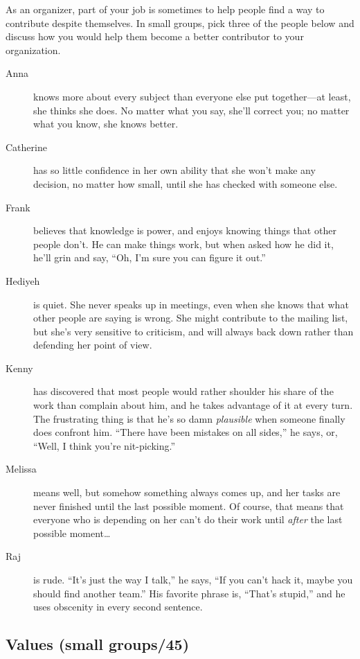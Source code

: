 As an organizer, part of your job is sometimes to help people find a way
to contribute despite themselves. In small groups, pick three of the
people below and discuss how you would help them become a better
contributor to your organization.

\begin{description}
\item[Anna]
knows more about every subject than everyone else put together---at
least, she thinks she does. No matter what you say, she'll correct
you; no matter what you know, she knows better.
\item[Catherine]
has so little confidence in her own ability that she won't make any
decision, no matter how small, until she has checked with someone
else.
\item[Frank]
believes that knowledge is power, and enjoys knowing things that
other people don't. He can make things work, but when asked how he
did it, he'll grin and say, ``Oh, I'm sure you can figure it out.''
\item[Hediyeh]
is quiet. She never speaks up in meetings, even when she knows that
what other people are saying is wrong. She might contribute to the
mailing list, but she's very sensitive to criticism, and will always
back down rather than defending her point of view.
\item[Kenny]
has discovered that most people would rather shoulder his share of
the work than complain about him, and he takes advantage of it at
every turn. The frustrating thing is that he's so damn \emph{plausible}
when someone finally does confront him. ``There have been mistakes on
all sides,'' he says, or, ``Well, I think you're nit-picking.''
\item[Melissa]
means well, but somehow something always comes up, and her tasks are
never finished until the last possible moment. Of course, that means
that everyone who is depending on her can't do their work until
\emph{after} the last possible moment{\ldots}
\item[Raj]
is rude. ``It's just the way I talk,'' he says, ``If you can't hack it,
maybe you should find another team.'' His favorite phrase is, ``That's
stupid,'' and he uses obscenity in every second sentence.
\end{description}

\subsection*{Values (small groups/45)}

